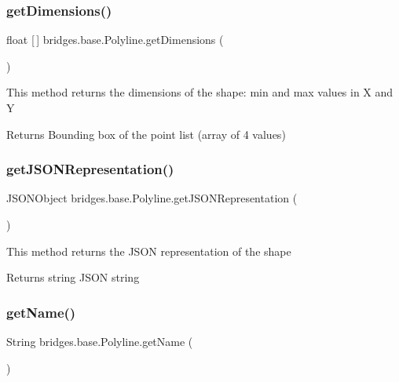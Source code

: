 \subsubsection{\texorpdfstring{get\+Dimensions()}{getDimensions()}}
{\footnotesize\ttfamily float \mbox{[}$\,$\mbox{]} bridges.\+base.\+Polyline.\+get\+Dimensions (\begin{DoxyParamCaption}{ }\end{DoxyParamCaption})}

This method returns the dimensions of the shape\+: min and max values in X and Y

\begin{DoxyReturn}{Returns}
Bounding box of the point list (array of 4 values) 
\end{DoxyReturn}
\mbox{\label{classbridges_1_1base_1_1_polyline_a4ac266909645f8db9b7fcc4836f6069a}} 
\subsubsection{\texorpdfstring{get\+J\+S\+O\+N\+Representation()}{getJSONRepresentation()}}
{\footnotesize\ttfamily J\+S\+O\+N\+Object bridges.\+base.\+Polyline.\+get\+J\+S\+O\+N\+Representation (\begin{DoxyParamCaption}{ }\end{DoxyParamCaption})}

This method returns the J\+S\+ON representation of the shape

\begin{DoxyReturn}{Returns}
string J\+S\+ON string 
\end{DoxyReturn}
\mbox{\label{classbridges_1_1base_1_1_polyline_a5b56cee642a6381ea940c75a336076ea}} 
\subsubsection{\texorpdfstring{get\+Name()}{getName()}}
{\footnotesize\ttfamily String bridges.\+base.\+Polyline.\+get\+Name (\begin{DoxyParamCaption}{ }\end{DoxyParamCaption})}


